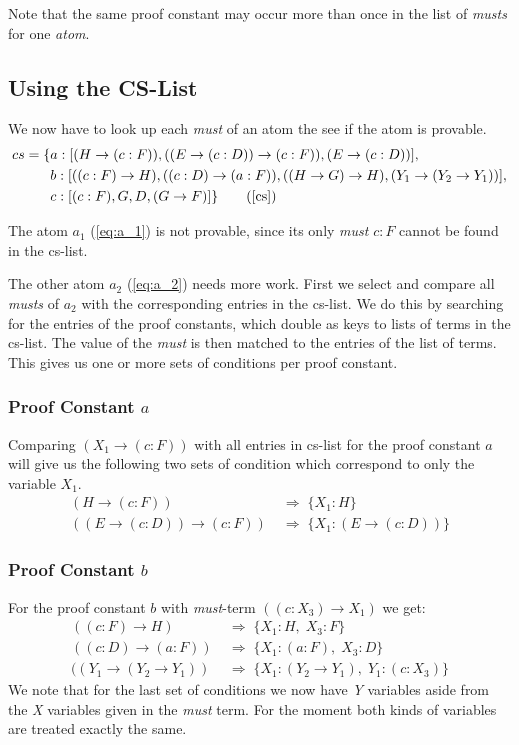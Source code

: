 Note that the same proof constant may occur more than once in the list of \emph{musts} for one \emph{atom}. 

\subsection{Using the CS-List}
We now have to look up each \emph{must} of an atom the see if the atom is provable.
\begin{align*}
	cs = \{& a: [(H \rightarrow (c:F)), ((E \rightarrow (c:D)) \rightarrow (c:F)), (E \rightarrow (c:D))],\\
	& b: [((c:F) \rightarrow H), ((c:D) \rightarrow (a:F)), ((H \rightarrow G) \rightarrow H), (Y_1 \rightarrow (Y_2 \rightarrow Y_1))],\\
	& c: [(c:F), G, D, (G \rightarrow F)]\}
	\tag{\ref{cs}}
\end{align*}

The atom $a_1$ (\ref{eq:a_1}) is not provable, since its only \emph{must} $c:F$ cannot be found in the cs-list.

The other atom $a_2$ (\ref{eq:a_2}) needs more work. First we select and compare all \emph{musts} of $a_2$ with the corresponding entries in the cs-list. We do this by searching for the entries of the proof constants, which double as keys to lists of terms in the cs-list. The value of the \emph{must} is then matched to the entries of the list of terms. This gives us one or more sets of conditions per proof constant.  

\subsubsection[look up proof constant a]{Proof Constant $a$}
Comparing $(X_1 \rightarrow (c:F))$ with all entries in cs-list for the proof constant $a$ will give us the following two sets of condition which correspond to only the variable $X_1$.
\begin{align}
	(H \rightarrow (c:F)) & \; \Rightarrow \; \{X_1: H\} \nonumber\\ 
	((E \rightarrow (c:D)) \rightarrow (c:F)) & \; \Rightarrow  \; \{X_1: (E \rightarrow (c:D))\} \label{condition:a}
\end{align}

\subsubsection[look up proof constant b]{Proof Constant $b$}
For the proof constant $b$ with \emph{must}-term $((c:X_3) \rightarrow X_1)$ we get:
\begin{align}
	((c:F) \rightarrow H) & \; \Rightarrow \; \{X_1: H,\; X_3: F\}\nonumber\\ 
	((c:D) \rightarrow (a:F)) & \; \Rightarrow \; \{X_1: (a:F),\; X_3: D\}\nonumber\\ 
	((Y_1 \rightarrow (Y_2 \rightarrow Y_1)) & \; \Rightarrow \; \{X_1: (Y_2 \rightarrow Y_1),\; Y_1: (c:X_3)\} \label{condition:b}
\end{align}
We note that for the last set of conditions we now have \emph{Y} variables aside from the \emph{X} variables given in the \emph{must} term. For the moment both kinds of variables are treated exactly the same.

